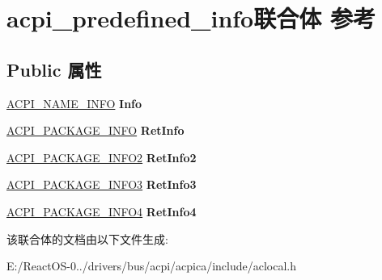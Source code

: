 \hypertarget{unionacpi__predefined__info}{}\section{acpi\+\_\+predefined\+\_\+info联合体 参考}
\label{unionacpi__predefined__info}
\subsection*{Public 属性}
\begin{DoxyCompactItemize}
\item 
\mbox{\label{unionacpi__predefined__info_a6e4b98a92701dc4ef616ceb53a033335}} 
\hyperlink{structacpi__name__info}{A\+C\+P\+I\+\_\+\+N\+A\+M\+E\+\_\+\+I\+N\+FO} {\bfseries Info}
\item 
\mbox{\label{unionacpi__predefined__info_ae41921d0e0a6eb73dc094592c740b988}} 
\hyperlink{structacpi__package__info}{A\+C\+P\+I\+\_\+\+P\+A\+C\+K\+A\+G\+E\+\_\+\+I\+N\+FO} {\bfseries Ret\+Info}
\item 
\mbox{\label{unionacpi__predefined__info_a2c6c794a4f71ef0fb5af495b8ab4a9c9}} 
\hyperlink{structacpi__package__info2}{A\+C\+P\+I\+\_\+\+P\+A\+C\+K\+A\+G\+E\+\_\+\+I\+N\+F\+O2} {\bfseries Ret\+Info2}
\item 
\mbox{\label{unionacpi__predefined__info_af9faf0e3fbe40605dcfc074e739995a0}} 
\hyperlink{structacpi__package__info3}{A\+C\+P\+I\+\_\+\+P\+A\+C\+K\+A\+G\+E\+\_\+\+I\+N\+F\+O3} {\bfseries Ret\+Info3}
\item 
\mbox{\label{unionacpi__predefined__info_a64b9c497d68fbf9e397907023858b3c0}} 
\hyperlink{structacpi__package__info4}{A\+C\+P\+I\+\_\+\+P\+A\+C\+K\+A\+G\+E\+\_\+\+I\+N\+F\+O4} {\bfseries Ret\+Info4}
\end{DoxyCompactItemize}


该联合体的文档由以下文件生成\+:\begin{DoxyCompactItemize}
\item 
E\+:/\+React\+O\+S-\/0../drivers/bus/acpi/acpica/include/aclocal.\+h\end{DoxyCompactItemize}
